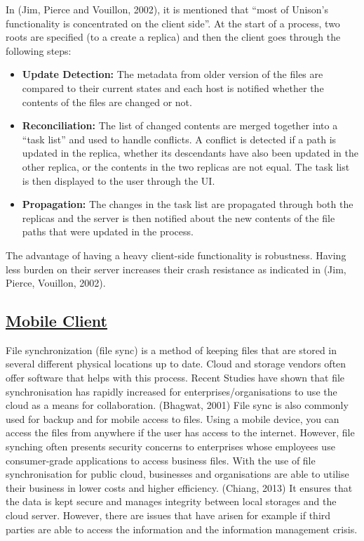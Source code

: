 \documentclass{article}
\begin{document}
In (Jim, Pierce and Vouillon, 2002), it is mentioned that “most of Unison’s functionality is concentrated on the client side”. At the start of a process, two roots are specified (to a create a replica) and then the client goes through the following steps:
\begin{itemize}
\item \textbf{Update Detection:} The metadata from older version of the files are compared to their current states and each host is notified whether the contents of the files are changed or not.
\item \textbf{Reconciliation:} The list of changed contents are merged together into a “task list” and used to handle conflicts. A conflict is detected if a path is updated in the replica, whether its descendants have also been updated in the other replica, or the contents in the two replicas are not equal. The task list is then displayed to the user through the UI.
\item \textbf{Propagation:} The changes in the task list are propagated through both the replicas and the server is then notified about the new contents of the file paths that were updated in the process.
\end{itemize}
The advantage of having a heavy client-side functionality is robustness. Having less burden on their server increases their crash resistance as indicated in (Jim, Pierce, Vouillon, 2002).

\subsection{\underline{Mobile Client}}
File synchronization (file sync) is a method of keeping files that are stored in several different physical locations up to date. Cloud and storage vendors often offer software that helps with this process. Recent Studies have shown that file synchronisation has rapidly increased for enterprises/organisations to use the cloud as a means for collaboration. (Bhagwat, 2001) File sync is also commonly used for backup and for mobile access to files. Using a mobile device, you can access the files from anywhere if the user has access to the internet. However, file synching often presents security concerns to enterprises whose employees use consumer-grade applications to access business files. With the use of file synchronisation for public cloud, businesses and organisations are able to utilise their business in lower costs and higher efficiency. (Chiang, 2013) It ensures that the data is kept secure and manages integrity between local storages and the cloud server. However, there are issues that have arisen for example if third parties are able to access the information and the information management crisis.
\end{document}
